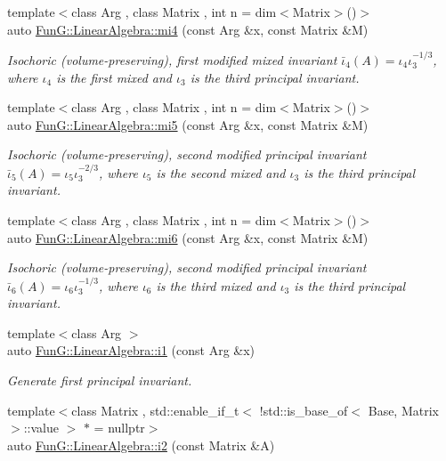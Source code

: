 \begin{DoxyCompactItemize}
{\footnotesize template$<$class Arg , class Matrix , int n = dim$<$\+Matrix$>$()$>$ }\\auto \hyperlink{group__InvariantGroup_ga7ee54c5d056877bdefefb8e54ad17791}{Fun\+G\+::\+Linear\+Algebra\+::mi4} (const Arg \&x, const Matrix \&M)
\begin{DoxyCompactList}\small\item\em Isochoric (volume-\/preserving), first modified mixed invariant $ \bar\iota_4(A)=\iota_4\iota_3^{-1/3} $, where $\iota_4$ is the first mixed and $\iota_3$ is the third principal invariant. \end{DoxyCompactList}\item 
{\footnotesize template$<$class Arg , class Matrix , int n = dim$<$\+Matrix$>$()$>$ }\\auto \hyperlink{group__InvariantGroup_ga189bc682b34d13902da335c5eb502faa}{Fun\+G\+::\+Linear\+Algebra\+::mi5} (const Arg \&x, const Matrix \&M)
\begin{DoxyCompactList}\small\item\em Isochoric (volume-\/preserving), second modified principal invariant $ \bar\iota_5(A)=\iota_5\iota_3^{-2/3} $, where $\iota_5$ is the second mixed and $\iota_3$ is the third principal invariant. \end{DoxyCompactList}\item 
{\footnotesize template$<$class Arg , class Matrix , int n = dim$<$\+Matrix$>$()$>$ }\\auto \hyperlink{group__InvariantGroup_ga3e451f9e15fa95080f81d0c0f69f93e6}{Fun\+G\+::\+Linear\+Algebra\+::mi6} (const Arg \&x, const Matrix \&M)
\begin{DoxyCompactList}\small\item\em Isochoric (volume-\/preserving), second modified principal invariant $ \bar\iota_6(A)=\iota_6\iota_3^{-1/3} $, where $\iota_6$ is the third mixed and $\iota_3$ is the third principal invariant. \end{DoxyCompactList}\item 
{\footnotesize template$<$class Arg $>$ }\\auto \hyperlink{group__InvariantGroup_gafaead59b618d87239270f8eca2bf75c8}{Fun\+G\+::\+Linear\+Algebra\+::i1} (const Arg \&x)
\begin{DoxyCompactList}\small\item\em Generate first principal invariant. \end{DoxyCompactList}\item 
{\footnotesize template$<$class Matrix , std\+::enable\+\_\+if\+\_\+t$<$ !std\+::is\+\_\+base\+\_\+of$<$ Base, Matrix $>$\+::value $>$ $\ast$  = nullptr$>$ }\\auto \hyperlink{group__InvariantGroup_ga9e442bab8f203bcd5634a3d0e65bf802}{Fun\+G\+::\+Linear\+Algebra\+::i2} (const Matrix \&A)

\end{DoxyCompactItemize}
